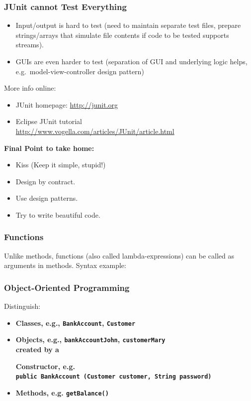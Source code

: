 \documentclass{beamer}
\def\mcolor#1#2{\rule{0ex}{0ex}\color{#1}#2\color{black}{}}
\begin{document}
\begin{frame}
\frametitle{JUnit cannot Test Everything}
\begin{itemize}
\item Input/output is hard to test
  (need to maintain separate test
  files, prepare strings/arrays that simulate file contents if code
  to be tested supports streams). 
\item GUIs are even harder to test
   (separation of GUI and underlying logic helps, e.g.\ model-view-controller design pattern)
\end{itemize}

More info online:
\begin{itemize}
\item JUnit homepage: \href{http://junit.org}{http://junit.org}
\item Eclipse JUnit tutorial\\
\href{http://www.vogella.com/articles/JUnit/article.html}{http://www.vogella.com/articles/JUnit/article.html}
\end{itemize}
\bigskip\mpause

\mcolor{blue}{\textbf{Final Point to take home:}}
\begin{itemize}
\item Kiss (Keep it simple, stupid!)
\item Design by contract.
\item Use design patterns.
\item Try to write beautiful code.
\end{itemize} %
\end{frame}

\begin{frame}
  \frametitle{Functions} Unlike methods, functions (also called
  lambda-expressions) can be called as arguments in methods. Syntax
  example:
\begin{small}

\end{small}
\end{frame}


\begin{frame}
\frametitle{Object-Oriented Programming}
Distinguish:

\begin{itemize}
\item \mcolor{blue}{\bf Classes}, e.g., \texttt{BankAccount}, \texttt{Customer}
\item \mcolor{blue}{\bf Objects}, e.g., \texttt{bankAccountJohn}, \texttt{customerMary}\\
 created by a \mcolor{blue}{\bf Constructor}, e.g.\\
    \texttt{public BankAccount (Customer customer, String password)}
\item \mcolor{blue}{\bf Methods}, e.g.  \texttt{getBalance()}
\end{itemize}
\end{frame}
\end{document}
